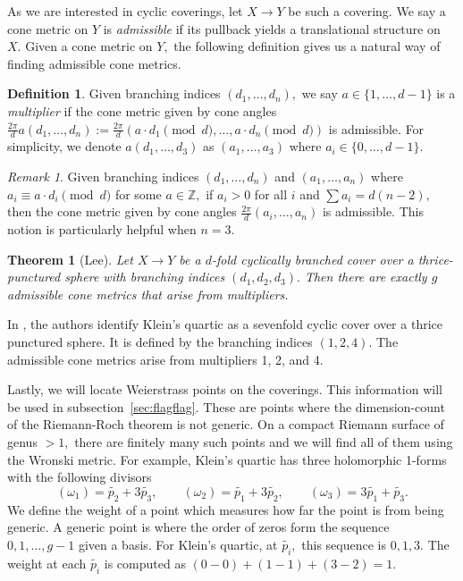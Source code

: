 \documentclass[12pt,reqno]{amsart}
\newtheorem*{thm*}{Theorem}
\theoremstyle{definition}
\newtheorem{defn}{Definition}
\theoremstyle{remark}
\newtheorem*{remark}{Remark}
\begin{document}
As we are interested in cyclic coverings, let $X \rightarrow Y$ be such a covering. We say a cone metric on $Y$ is \textit{admissible} if its pullback yields a translational structure on $X.$ Given a cone metric on $Y,$ the following definition gives us a natural way of finding admissible cone metrics. 

\begin{defn} Given branching indices $(d_1, \ldots , d_n),$ we say $a \in \{1, \ldots, d - 1\}$ is a \textit{multiplier} if the cone metric given by cone angles $\frac{2 \pi}{d} a (d_1, \ldots , d_n) := \frac{2 \pi}{d} (a \cdot d_1 \pmod d, \ldots , a \cdot d_n \pmod d)$ is admissible. For simplicity, we denote $a (d_1,\ldots , d_3)$ as $(a_1, \ldots , a_3)$ where $a_i \in \{0, \ldots , d - 1\}.$ \end{defn}

\begin{remark} Given branching indices $(d_1, \ldots , d_n)$ and $(a_1, \ldots , a_n)$ where $a_i \equiv a \cdot d_i \pmod d$ for some $a \in \mathbb{Z},$ if $a_i > 0$ for all $i$ and $\sum a_i = d (n - 2),$ then the cone metric given by cone angles $\frac{2 \pi}{d} (a_i, \ldots , a_n)$ is admissible. This notion is particularly helpful when $n = 3.$\end{remark}

\begin{thm*} [Lee]
Let $X \rightarrow Y$ be a $d$-fold cyclically branched cover over a thrice-punctured sphere with branching indices $(d_1, d_2, d_3).$ Then there are exactly $g$ admissible cone metrics that arise from multipliers. 
\end{thm*}

In \cite{kw}, the authors identify Klein's quartic as a sevenfold cyclic cover over a thrice punctured sphere. It is defined by the branching indices $(1, 2, 4).$ The admissible cone metrics arise from multipliers 1, 2, and 4. 

Lastly, we will locate Weierstrass points on the coverings. This information will be used in subsection~\ref{sec:flagflag}. These are points where the dimension-count of the Riemann-Roch theorem is not generic. On a compact Riemann surface of genus $> 1,$ there are finitely many such points and we will find all of them using the Wronski metric. For example, Klein's quartic has three holomorphic 1-forms with the following divisors $$(\omega_1) = \widetilde{p_2} + 3 \widetilde{p_3}, \qquad (\omega_2) = \widetilde{p_1} + 3 \widetilde{p_2}, \qquad (\omega_3) = 3 \widetilde{p_1} + \widetilde{p_3}.$$ We define the weight of a point which measures how far the point is from being generic. A generic point is where the order of zeros form the sequence $0, 1, \ldots , g - 1$ given a basis. For Klein's quartic, at $\widetilde{p_i},$ this sequence is $0, 1, 3.$ The weight at each $\widetilde{p_i}$ is computed as $(0 - 0) + (1 - 1) + (3 - 2) = 1.$ 
\end{document}
